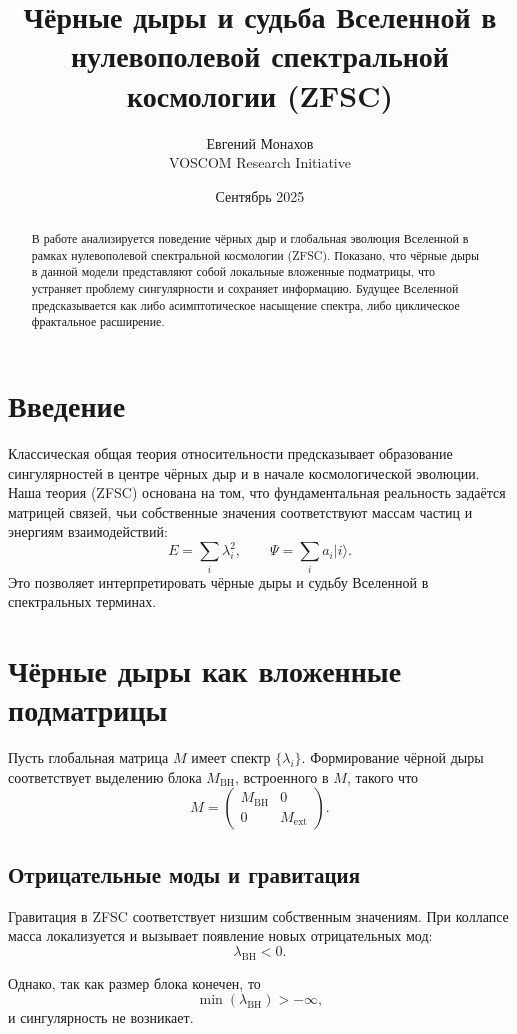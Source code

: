\documentclass[12pt,a4paper]{article}
\title{Чёрные дыры и судьба Вселенной в нулевополевой спектральной космологии (ZFSC)}
\author{Евгений Монахов \\ VOSCOM Research Initiative}
\date{Сентябрь 2025}
\begin{document}
\maketitle

\begin{abstract}
В работе анализируется поведение чёрных дыр и глобальная эволюция Вселенной в рамках нулевополевой спектральной космологии (ZFSC). 
Показано, что чёрные дыры в данной модели представляют собой локальные вложенные подматрицы, что устраняет проблему сингулярности и сохраняет информацию. 
Будущее Вселенной предсказывается как либо асимптотическое насыщение спектра, либо циклическое фрактальное расширение.
\end{abstract}

\section{Введение}
Классическая общая теория относительности предсказывает образование сингулярностей в центре чёрных дыр и в начале космологической эволюции. 
Наша теория (ZFSC) основана на том, что фундаментальная реальность задаётся матрицей связей, чьи собственные значения соответствуют массам частиц и энергиям взаимодействий:
\[
E = \sum_i \lambda_i^2, \qquad \Psi = \sum_i a_i |i\rangle.
\]
Это позволяет интерпретировать чёрные дыры и судьбу Вселенной в спектральных терминах.

\section{Чёрные дыры как вложенные подматрицы}
Пусть глобальная матрица $M$ имеет спектр $\{\lambda_i\}$. 
Формирование чёрной дыры соответствует выделению блока $M_{\text{BH}}$, встроенного в $M$, такого что
\[
M = \begin{pmatrix}
M_{\text{BH}} & 0 \\ 0 & M_{\text{ext}}
\end{pmatrix}.
\]

\subsection{Отрицательные моды и гравитация}
Гравитация в ZFSC соответствует низшим собственным значениям. 
При коллапсе масса локализуется и вызывает появление новых отрицательных мод:
\[
\lambda_{\text{BH}} < 0.
\]

Однако, так как размер блока конечен, то
\[
\min(\lambda_{\text{BH}}) > -\infty,
\]
и сингулярность не возникает.
\end{document}
